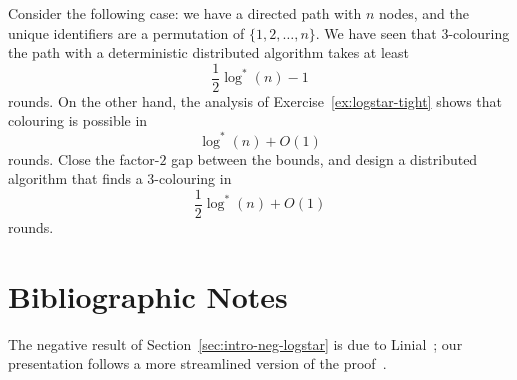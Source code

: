 \begin{exs}
    Consider the following case: we have a directed path with $n$ nodes, and the unique identifiers are a permutation of $\{1,2,\dotsc,n\}$. We have seen that $3$-colouring the path with a deterministic distributed algorithm takes at least
    \[
        \frac{1}{2} \log^*(n) - 1
    \]
    rounds. On the other hand, the analysis of Exercise~\ref{ex:logstar-tight} shows that colouring is possible in
    \[
        \log^*(n) + O(1)
    \]
    rounds. Close the factor-$2$ gap between the bounds, and design a distributed algorithm that finds a $3$-colouring in
    \[
        \frac{1}{2} \log^*(n) + O(1)
    \]
    rounds.
\end{exs}


\section{Bibliographic Notes}

The negative result of Section~\ref{sec:intro-neg-logstar} is due to Linial~\cite{linial92locality}; our presentation follows a more streamlined version of the proof~\cite{laurinharju14linial-easy}.

